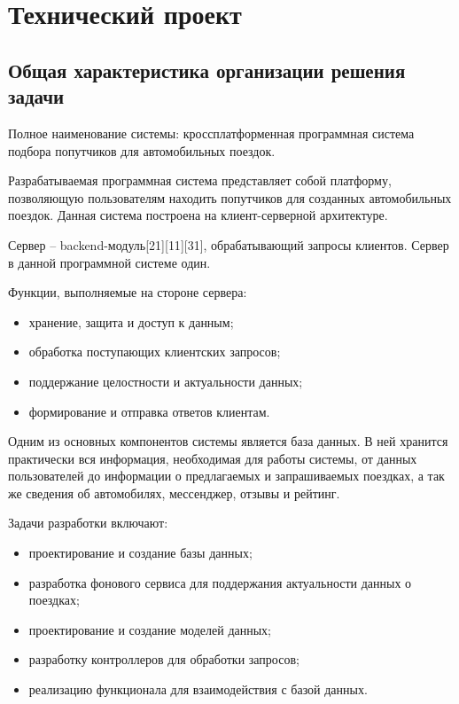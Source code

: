 \section{Технический проект}
\subsection{Общая характеристика организации решения задачи}

Полное наименование системы: кроссплатформенная программная система подбора попутчиков для автомобильных поездок.

Разрабатываемая программная система представляет собой платформу, позволяющую пользователям находить попутчиков для созданных автомобильных поездок. Данная система построена на клиент-серверной архитектуре.

Сервер – backend-модуль[{21}][{11}][{31}], обрабатывающий запросы клиентов. Сервер в данной программной системе один.

Функции, выполняемые на стороне сервера:

\begin{itemize}
	\item хранение, защита и доступ к данным;
	\item обработка поступающих клиентских запросов;
	\item поддержание целостности и актуальности данных;
	\item формирование и отправка ответов клиентам.
\end{itemize}

Одним из основных компонентов системы является база данных. В ней хранится практически вся информация, необходимая для работы системы, от данных пользователей до информации о предлагаемых и запрашиваемых поездках, а так же сведения об автомобилях, мессенджер, отзывы и рейтинг.

Задачи разработки включают:

\begin{itemize}
	\item проектирование и создание базы данных;
	\item разработка фонового сервиса для поддержания актуальности данных о поездках;
	\item проектирование и создание моделей данных;
	\item разработку контроллеров для обработки запросов;
	\item реализацию функционала для взаимодействия с базой данных.
\end{itemize}

